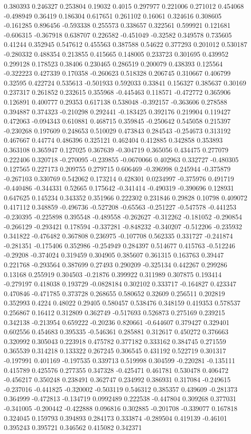 0.380393 0.246327 0.253804 0.19032 0.4015 0.297977 0.221006 0.271012 0.454068 -0.498949 0.36419 0.186304 0.617651 0.261102 0.16061 0.324616 0.308605 -0.161285 0.896456 -0.593338 0.255573 0.338657 0.322561 0.599921 0.121681 -0.606315 -0.367918 0.638707 0.226582 -0.451049 -0.32582 0.349578 0.735605 0.41244 0.352945 0.547612 0.455563 0.387588 0.54622 0.377293 0.201012 0.530187 -0.280332 0.488354 0.213855 0.415665 0.148005 0.233723 0.301695 0.439952 0.299128 0.178523 0.38406 0.230465 0.286519 0.200079 0.438393 0.125564 -0.322223 0.427339 0.170358 -0.260623 0.518328 0.206745 0.310667 0.406799 0.32595 0.422724 0.535613 -0.501933 0.592033 0.33841 0.156327 0.385637 0.30169 0.237317 0.261852 0.232615 0.355968 -0.445463 0.118571 -0.472772 0.365906 0.126891 0.400777 0.29353 0.617138 0.538048 -0.392157 -0.363606 0.278588 0.394887 0.374323 -0.210298 0.292441 -0.183425 0.392176 0.219904 0.119427 0.472063 -0.094343 0.610881 0.468715 0.359845 -0.250642 0.545058 0.215397 -0.230268 0.197609 0.248653 0.510029 0.473843 0.284543 -0.254673 0.313192 0.467667 0.44774 0.486396 0.325121 0.462404 0.412885 0.342858 0.353893 0.363108 0.365947 0.127025 0.367639 -0.304719 0.365056 0.434475 0.277079 0.222406 0.320718 -0.270095 -0.239855 -0.0670066 0.402963 0.332727 -0.480305 0.127565 0.227173 0.209755 0.279715 0.606469 -0.396998 0.245944 -0.375879 -0.267103 0.330769 0.542062 0.173214 0.428301 0.0234997 -0.375976 0.491719 -0.440486 -0.344331 0.52665 0.175642 -0.341414 -0.490319 -0.390696 0.128931 0.647625 0.145234 0.343352 0.351966 0.222302 0.231846 0.29828 0.10798 0.409072 0.417112 0.348859 -0.496736 -0.527208 -0.65563 -0.251227 -0.547578 -0.441253 -0.230395 -0.225898 0.395548 -0.489558 -0.262627 -0.312262 -0.181052 -0.290854 -0.266129 -0.293421 0.178594 -0.337281 -0.848232 -0.340207 -0.512206 -0.235932 0.341822 -0.476482 0.367808 0.236975 -0.107708 0.562335 0.331727 -0.241874 -0.281351 -0.175406 0.352986 -0.254949 0.284397 0.514677 0.415763 -0.512246 -0.29208 -0.374024 0.319459 0.304905 0.385607 0.361315 0.163763 0.39447 0.221768 -0.293564 0.387699 0.27493 0.290209 -0.325134 0.442267 0.299286 0.13168 0.255919 0.304503 -0.21876 0.399922 0.311989 0.307875 0.193414 -0.279197 0.418038 0.193729 -0.0828184 0.302102 0.333717 -0.164827 0.423347 0.470846 -0.471785 0.373728 0.268655 0.580652 0.32609 0.256511 0.202819 0.352993 0.4224 0.48022 0.29405 0.580457 0.538476 0.348159 0.419353 0.578537 0.256867 0.16412 0.312809 0.362749 -0.517693 0.526873 0.275169 0.239215 0.342138 -0.213954 0.659222 -0.20236 0.820661 -0.644607 0.379427 0.329401 0.602556 0.454683 0.395335 -0.546361 0.285881 0.312617 0.450272 0.376663 0.320992 0.305043 0.223918 0.475782 0.377182 0.333162 0.384745 0.271559 0.365539 0.314218 0.133322 0.267245 0.306545 0.431192 0.522719 0.301317 -0.197991 0.401169 -0.197535 0.339713 0.519998 0.304599 -0.220281 -0.135111 0.415789 0.425576 0.277355 0.347328 -0.425471 0.461781 0.530478 0.406472 -0.456217 0.350248 0.238491 0.362747 0.234992 0.386931 0.317084 -0.249615 -0.237016 -0.441825 -0.320002 -0.503119 0.546312 0.385357 0.439609 -0.281373 0.364999 -0.472813 -0.134719 0.0992489 0.222538 -0.447804 0.309268 0.377031 -0.341005 -0.200442 -0.422888 0.096816 0.302885 -0.201708 -0.339077 0.167818 0.324045 0.159793 0.394893 0.284173 0.333874 -0.289504 0.419139 -0.46101 0.395243 0.395721 0.346562 0.415082 0.342371 